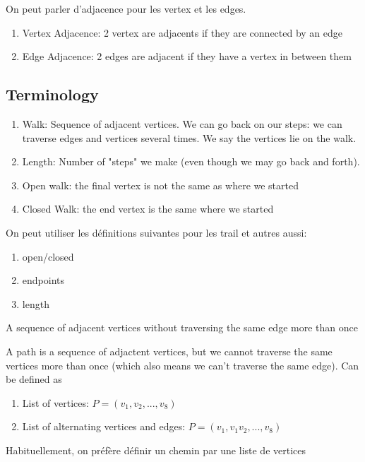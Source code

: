 \documentclass{article}
\begin{document}
\begin{definition}[Adjacence]
    On peut parler d'adjacence pour les vertex et les edges.
    \begin{enumerate}
        \item Vertex Adjacence: 2 vertex are adjacents if they are
	    connected by an edge
        \item Edge Adjacence: 2 edges are adjacent if they have a
	    vertex in between them
    \end{enumerate}
\end{definition}

\subsection{Terminology}%
\label{ssub:Terminology}

\begin{definition}[Walk]
    \begin{enumerate}
        \item Walk: Sequence of adjacent vertices. We can go back on our
	    steps: we can traverse edges and vertices several times.
	    We say the vertices lie on the walk.
	\item Length: Number of "steps" we make (even though we may go
	    back and forth).
	\item Open walk: the final vertex is not the same as where we
	    started
	\item Closed Walk: the end vertex is the same where we started
    \end{enumerate}
\end{definition}

\begin{remark}
    On peut utiliser les définitions suivantes pour les trail et autres
    aussi:
    \begin{enumerate}
        \item open/closed
	\item endpoints
	\item length
    \end{enumerate}
\end{remark}

\begin{definition}[Trail]
    A sequence of adjacent vertices without traversing the same edge
    more than once
\end{definition}

\begin{definition}[Path]
    A path is a sequence of adjactent vertices, but we cannot traverse
    the same vertices more than once (which also means we can't
    traverse the same edge). Can be defined as
    \begin{enumerate}
	\item List of vertices: $ P=(v_1, v_2, ..., v_8)$
	\item List of alternating vertices and edges: $ P=(v_1, v_1v_2,
	    ..., v_8) $
    \end{enumerate}
    Habituellement, on préfère définir un chemin par une liste de vertices
\end{definition}
\end{document}
